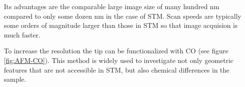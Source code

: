 Its advantages are the comparable large image size of many hundred \si{\nm} compared to only some dozen \si{\nm} in the case of STM. Scan speeds are typically some orders of magnitude larger than those in STM so that image acquision is much faster.

To increase the resolution the tip can be functionalized with CO (see figure \ref{fig:AFM-CO}). This method is widely used \cite{kawai_multiple_2018, kawai_atomically_2015, schulz_elemental_2018, gross_chemical_2009} to investigate not only geometric features that are not accessible in STM, but also chemical differences in the sample. 